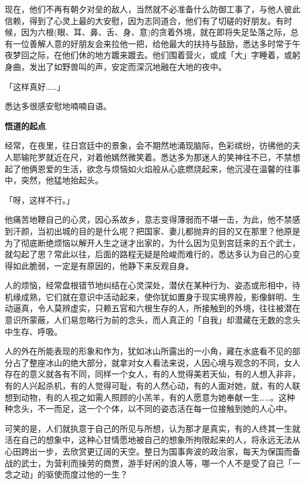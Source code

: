 \documentclass[12pt,twoside,openany]{book}
\newcommand{\mt}[1]{\textbullet \textbf{#1}}
\begin{document}
现在，他们不再有朝夕对垒的敌人，当然就不必准备什么防御工事了，与他人彼此信赖，得到了心灵上最的大安慰，因为志同道合，他们有了切磋的好朋友。有时候，因为六根(眼、耳、鼻、舌、身、意)的贪着外境，就在即将失足坠落之际，总有一位善解人意的好朋友会来拉他一把，给他最大的扶持与鼓励，悉达多时常于午夜梦回之际，在他们休的地方踱来踱去。他们围着营火，或成「大」字睡着，或躬身曲，发出了如野兽叫的声，安定而深沉地融在大地的夜中。

「这样真好……」

悉达多很感安慰地喃喃自语。

\mt{悟道的起点}

经常，在夜里，往日宫廷中的景象，会不期然地涌现脑际，色彩缤纷，彷彿他的夫人耶输陀罗就近在尺，对着他嫣然微笑着。悉达多为那迷人的笑神往不已，不禁想起了他俩恩爱的生活，欲念与烦恼如火焰般从心底燃烧起来，他沉浸在温馨的往事中，突然，他猛地抬起头。

「呀，这样不行。」

他痛苦地鞭自己的心灵，因心系故乡，意志变得薄弱而不堪一击，为此，他不禁感到汗颜，当初出城的目的是什么呢？把国家、妻儿都抛弃的目的又在那里？他原是为了彻底断绝烦恼以解开人生之谜才出家的，为什么因为见到宫廷来的五个武士，就勾起了思？常此以往，后面的路程无疑是险峻而难行的，悉达多认为自己的心变得如此脆弱，一定是有原因的，他静下来反观自身。

人的烦恼，经常盘根错节地纠结在心灵深处，潜伏在某种行为、姿态或形相中，待机缘成熟，它们就在意识中活动起来，使你犹如置身于现实境界般，影像鲜明、生动逼真，令人莫辨虚实，只赖五官和六根生存的人，所接触到的外境，往往被潜在意识所蒙蔽，人们易忽略行为前的念头，而人真正的「自我」却潜藏在无数的念头中生存、呼吸。

人的外在所能表现的形象和作为，犹如冰山所露出的一小角，藏在水底看不见的部分占了整座冰山的绝大部分，就拿对女人看法来说，人因心境与观念的不同，女人存在的意义就各有不同，同样一个女人，有的人觉得美若天仙，有的人想入非非，有的人兴起杀机，有的人觉得可耻，有的人然心动，有的人面对她，就，有的人联想到动物，有的人视之如需人照顾的小羔羊，有的人愿意为她奉献一生……。这种种念头，不一而足，这一个个体，以不同的姿态活在每一位接触到她的人心中。

可笑的是，人们就执意于自己的所见与所想，认为那才是真实，有的人终其一生就活在自己的想象中，这种心甘情愿地被自己的想象所拘限起来的人，将永远无法从心田跨出一步，去欣赏更辽阔的天空。整日为国事奔波的政治家，每天为保国而备战的武士，为营利而操劳的商贾，游手好闲的浪人等，哪一个人不是受了自己「一念之动」的驱使而度过他的一生？
\end{document}
